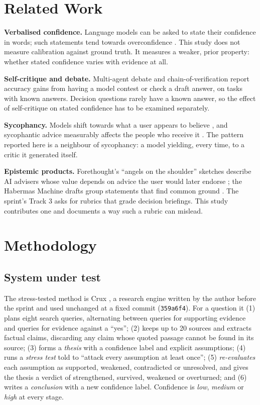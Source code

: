 \documentclass[11pt]{article}
\newcommand{\crux}{Crux}
\begin{document}
\section{Related Work}

\textbf{Verbalised confidence.} Language models can be asked to state their confidence in words; such statements tend towards overconfidence \cite{xiong2024uncertainty}. This study does not measure calibration against ground truth. It measures a weaker, prior property: whether stated confidence varies with evidence at all.

\textbf{Self-critique and debate.} Multi-agent debate \cite{du2023debate} and chain-of-verification \cite{dhuliawala2023cove} report accuracy gains from having a model contest or check a draft answer, on tasks with known answers. Decision questions rarely have a known answer, so the effect of self-critique on stated confidence has to be examined separately.

\textbf{Sycophancy.} Models shift towards what a user appears to believe \cite{sharma2023sycophancy}, and sycophantic advice measurably affects the people who receive it \cite{cheng2026sycophantic}. The pattern reported here is a neighbour of sycophancy: a model yielding, every time, to a critic it generated itself.

\textbf{Epistemic products.} Forethought's ``angels on the shoulder'' sketches describe AI advisers whose value depends on advice the user would later endorse \cite{forethought_angels}; the Habermas Machine drafts group statements that find common ground \cite{tessler2024habermas}. The sprint's Track 3 asks for rubrics that grade decision briefings. This study contributes one and documents a way such a rubric can mislead.

\section{Methodology}
\label{sec:method}

\subsection{System under test}

The stress-tested method is \crux{} \cite{crux}, a research engine written by the author before the sprint and used unchanged at a fixed commit (\texttt{359a6f4}). For a question it (1) plans eight search queries, alternating between queries for supporting evidence and queries for evidence against a ``yes''; (2) keeps up to 20 sources and extracts factual claims, discarding any claim whose quoted passage cannot be found in its source; (3) forms a \emph{thesis} with a confidence label and explicit assumptions; (4) runs a \emph{stress test} told to ``attack every assumption at least once''; (5) \emph{re-evaluates} each assumption as supported, weakened, contradicted or unresolved, and gives the thesis a verdict of strengthened, survived, weakened or overturned; and (6) writes a \emph{conclusion} with a new confidence label. Confidence is \emph{low}, \emph{medium} or \emph{high} at every stage.
\end{document}
